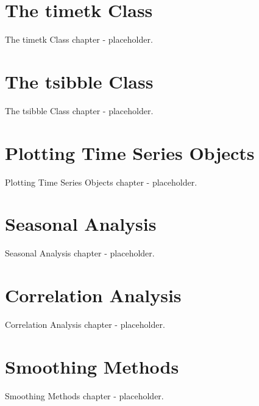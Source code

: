 \documentclass[
  letterpaper,
  DIV=11,
  numbers=noendperiod]{scrreprt}
\begin{document}
\hypertarget{the-timetk-class}{%
\chapter{The timetk Class}\label{the-timetk-class}}

The timetk Class chapter - placeholder.


\hypertarget{the-tsibble-class}{%
\chapter{The tsibble Class}\label{the-tsibble-class}}

The tsibble Class chapter - placeholder.


\hypertarget{plotting-time-series-objects}{%
\chapter{Plotting Time Series
Objects}\label{plotting-time-series-objects}}

Plotting Time Series Objects chapter - placeholder.


\hypertarget{seasonal-analysis}{%
\chapter{Seasonal Analysis}\label{seasonal-analysis}}

Seasonal Analysis chapter - placeholder.


\hypertarget{correlation-analysis}{%
\chapter{Correlation Analysis}\label{correlation-analysis}}

Correlation Analysis chapter - placeholder.


\hypertarget{smoothing-methods}{%
\chapter{Smoothing Methods}\label{smoothing-methods}}

Smoothing Methods chapter - placeholder.
\end{document}

